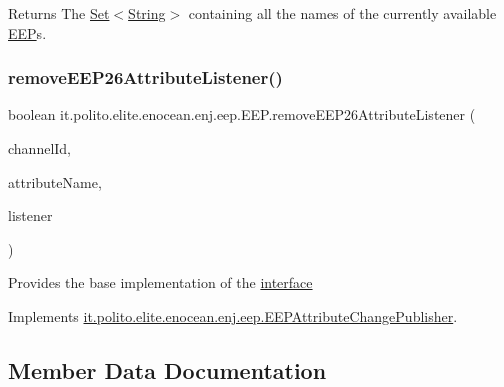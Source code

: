 \begin{DoxyReturn}{Returns}
The \hyperlink{}{Set}$<$\hyperlink{}{String}$>$ containing all the names of the currently available \hyperlink{classit_1_1polito_1_1elite_1_1enocean_1_1enj_1_1eep_1_1_e_e_p}{E\+EP}s. 
\end{DoxyReturn}
\hypertarget{classit_1_1polito_1_1elite_1_1enocean_1_1enj_1_1eep_1_1_e_e_p_a98771859eb0e1be096889989af319f85}{}\label{classit_1_1polito_1_1elite_1_1enocean_1_1enj_1_1eep_1_1_e_e_p_a98771859eb0e1be096889989af319f85} 
\subsubsection{\texorpdfstring{remove\+E\+E\+P26\+Attribute\+Listener()}{removeEEP26AttributeListener()}}
{\footnotesize\ttfamily boolean it.\+polito.\+elite.\+enocean.\+enj.\+eep.\+E\+E\+P.\+remove\+E\+E\+P26\+Attribute\+Listener (\begin{DoxyParamCaption}\item[{int}]{channel\+Id,  }\item[{String}]{attribute\+Name,  }\item[{\hyperlink{interfaceit_1_1polito_1_1elite_1_1enocean_1_1enj_1_1eep_1_1_e_e_p_attribute_change_listener}{E\+E\+P\+Attribute\+Change\+Listener}}]{listener }\end{DoxyParamCaption})}

Provides the base implementation of the \hyperlink{}{interface }

Implements \hyperlink{interfaceit_1_1polito_1_1elite_1_1enocean_1_1enj_1_1eep_1_1_e_e_p_attribute_change_publisher_a9c313dae8d996230bd8ddc6bcaa4c398}{it.\+polito.\+elite.\+enocean.\+enj.\+eep.\+E\+E\+P\+Attribute\+Change\+Publisher}.



\subsection{Member Data Documentation}
\hypertarget{classit_1_1polito_1_1elite_1_1enocean_1_1enj_1_1eep_1_1_e_e_p_af617ce25c766ff9906369ece400e8377}{}\label{classit_1_1polito_1_1elite_1_1enocean_1_1enj_1_1eep_1_1_e_e_p_af617ce25c766ff9906369ece400e8377} 

